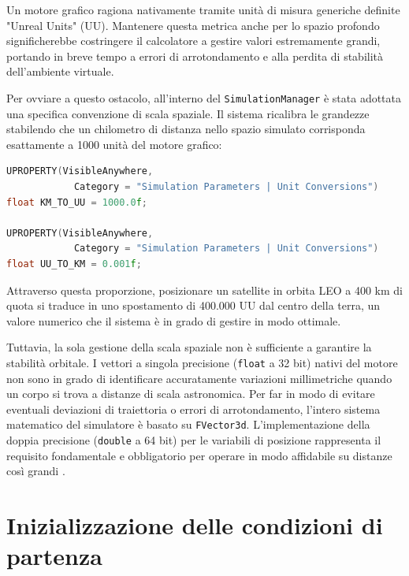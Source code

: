 Un motore grafico ragiona nativamente tramite unità di misura generiche definite "Unreal Units" (UU). Mantenere questa metrica anche per lo spazio profondo significherebbe costringere il calcolatore a gestire valori estremamente grandi, portando in breve tempo a errori di arrotondamento e alla perdita di stabilità dell'ambiente virtuale.

Per ovviare a questo ostacolo, all'interno del \lstinline|SimulationManager| è stata adottata una specifica convenzione di scala spaziale. Il sistema ricalibra le grandezze stabilendo che un chilometro di distanza nello spazio simulato corrisponda esattamente a 1000 unità del motore grafico:

\begin{lstlisting}[language=C++, caption={Fattori di scala per le distanze astronomiche in \lstinline|SimulationManager.h|.}]
UPROPERTY(VisibleAnywhere,
            Category = "Simulation Parameters | Unit Conversions")
float KM_TO_UU = 1000.0f;

UPROPERTY(VisibleAnywhere,
            Category = "Simulation Parameters | Unit Conversions")
float UU_TO_KM = 0.001f;
\end{lstlisting}

Attraverso questa proporzione, posizionare un satellite in orbita LEO a 400 km di quota si traduce in uno spostamento di 400.000 UU dal centro della terra, un valore numerico che il sistema è in grado di gestire in modo ottimale. 

Tuttavia, la sola gestione della scala spaziale non è sufficiente a garantire la stabilità orbitale. I vettori a singola precisione (\lstinline|float| a 32 bit) nativi del motore non sono in grado di identificare accuratamente variazioni millimetriche quando un corpo si trova a distanze di scala astronomica. Per far in modo di evitare eventuali deviazioni di traiettoria o errori di arrotondamento, l'intero sistema matematico del simulatore è basato su \lstinline|FVector3d|. L'implementazione della doppia precisione (\lstinline|double| a 64 bit) per le variabili di posizione rappresenta il requisito fondamentale e obbligatorio per operare in modo affidabile su distanze così grandi \cite{epicgames_unrealengine, meyers2013cpu}.


\section{Inizializzazione delle condizioni di partenza}

